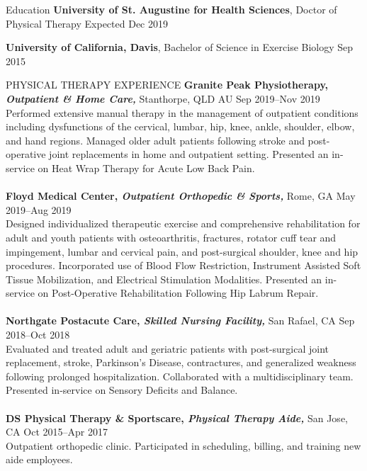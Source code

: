 \documentclass{resume} %
\begin{document}
\vspace{-15pt}
\begin{rSection}{Education}
{\bf University of St. Augustine for Health Sciences}, Doctor of Physical Therapy  \hfill {Expected Dec 2019}

{\bf University of California, Davis}, Bachelor of Science in Exercise Biology  \hfill {Sep 2015}
\end{rSection}
\begin{rSection}{PHYSICAL THERAPY EXPERIENCE}
{\textbf{Granite Peak Physiotherapy, \textit{Outpatient \& Home Care,}} Stanthorpe, QLD AU
\hfill Sep 2019--Nov 2019 \\
Performed extensive manual therapy in the management of outpatient conditions including dysfunctions of the cervical, lumbar, hip, knee, ankle, shoulder, elbow, and hand regions. Managed older adult patients following stroke and post-operative joint replacements in home and outpatient setting. Presented an in-service on Heat Wrap Therapy for Acute Low Back Pain.
}
\\\\
{\textbf{Floyd Medical Center, \textit{Outpatient Orthopedic \& Sports,}} Rome, GA
\hfill May 2019--Aug 2019 \\
 Designed individualized therapeutic exercise and comprehensive rehabilitation for adult and youth patients with osteoarthritis, fractures, rotator cuff tear and impingement, lumbar and cervical pain, and post-surgical shoulder, knee and hip procedures. Incorporated use of Blood Flow Restriction, Instrument Assisted Soft Tissue Mobilization, and Electrical Stimulation Modalities. Presented an in-service on Post-Operative Rehabilitation Following Hip Labrum Repair.}
 \\\\
{\textbf{Northgate Postacute Care, \textit{Skilled Nursing Facility,}} San Rafael, CA
\hfill Sep 2018--Oct 2018 \\
 Evaluated and treated adult and geriatric patients with post-surgical joint replacement, stroke, Parkinson's Disease, contractures, and generalized weakness following prolonged hospitalization. Collaborated with a multidisciplinary team. Presented in-service on Sensory Deficits and Balance.}
 \\\\
 {\textbf{DS Physical Therapy \& Sportscare, \textit{Physical Therapy Aide,}} San Jose, CA
\hfill Oct 2015--Apr 2017 \\
 Outpatient orthopedic clinic. Participated in scheduling, billing, and training new aide employees.}
\end{rSection} 
\end{document}
